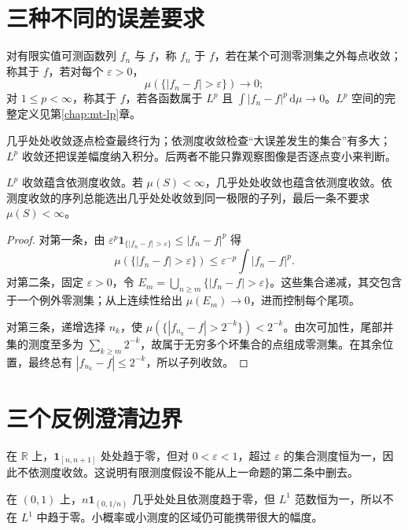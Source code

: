 \documentclass[UTF8,12pt,a4paper,fontset=fandol]{ctexbook}
\begin{document}
\section{三种不同的误差要求}
\begin{definition}
对有限实值可测函数列 $f_n$ 与 $f$，称 $f_n$ 于 $f$，若在某个可测零测集之外每点收敛；称其于 $f$，若对每个 $\varepsilon>0$，
\[
 \mu(\{|f_n-f|>\varepsilon\})\longrightarrow0;
\]
对 $1\leq p<\infty$，称其于 $f$，若各函数属于 $L^p$ 且 $\int|f_n-f|^p\,\mathrm d\mu\to0$。$L^p$ 空间的完整定义见第\ref{chap:mt-lp}章。
\end{definition}
几乎处处收敛逐点检查最终行为；依测度收敛检查“大误差发生的集合”有多大；$L^p$ 收敛还把误差幅度纳入积分。后两者不能只靠观察图像是否逐点变小来判断。

\begin{proposition}[收敛方式之间的联系]
$L^p$ 收敛蕴含依测度收敛。若 $\mu(S)<\infty$，几乎处处收敛也蕴含依测度收敛。依测度收敛的序列总能选出几乎处处收敛到同一极限的子列，最后一条不要求 $\mu(S)<\infty$。
\label{prop:mt-convergence-implications}
\end{proposition}
\begin{proof}
对第一条，由 $\varepsilon^p\mathbf1_{\{|f_n-f|>\varepsilon\}}\leq|f_n-f|^p$ 得
\[
 \mu(\{|f_n-f|>\varepsilon\})
 \leq\varepsilon^{-p}\int|f_n-f|^p.
\]
对第二条，固定 $\varepsilon>0$，令 $E_m=\bigcup_{n\geq m}\{|f_n-f|>\varepsilon\}$。这些集合递减，其交包含于一个例外零测集；从上连续性给出 $\mu(E_m)\to0$，进而控制每个尾项。

对第三条，递增选择 $n_k$，使 $\mu(\{|f_{n_k}-f|>2^{-k}\})<2^{-k}$。由次可加性，尾部并集的测度至多为 $\sum_{k\geq m}2^{-k}$，故属于无穷多个坏集合的点组成零测集。在其余位置，最终总有 $|f_{n_k}-f|\leq2^{-k}$，所以子列收敛。
\end{proof}

\section{三个反例澄清边界}
在 $\mathbb R$ 上，$\mathbf1_{[n,n+1]}$ 处处趋于零，但对 $0<\varepsilon<1$，超过 $\varepsilon$ 的集合测度恒为一，因此不依测度收敛。这说明有限测度假设不能从上一命题的第二条中删去。

在 $(0,1)$ 上，$n\mathbf1_{(0,1/n)}$ 几乎处处且依测度趋于零，但 $L^1$ 范数恒为一，所以不在 $L^1$ 中趋于零。小概率或小测度的区域仍可能携带很大的幅度。
\end{document}
